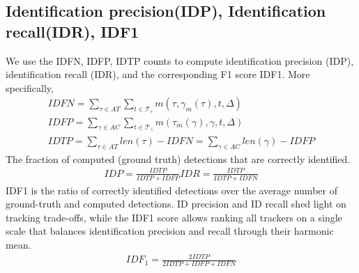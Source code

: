     \subsection{Identification precision(IDP), Identification recall(IDR), IDF1}
        We use the IDFN, IDFP, IDTP counts to compute identification precision (IDP), identification recall (IDR), and the corresponding F1 score IDF1. More specifically,
        \begin{align}
            IDFN = \sum_{\tau \in AT} \sum_{t \in \mathcal{T}_\tau} m(\tau, \gamma_m(\tau),t,\Delta) \\ 
            IDFP = \sum_{\gamma \in AC} \sum_{t \in \mathcal{T}_\gamma} m(\tau_m(\gamma),\gamma,t,\Delta) \\ 
            IDTP = \sum_{\tau \in  AT} len(\tau) - IDFN = \sum_{\gamma \in  AC} len(\gamma) - IDFP
        \end{align}        
        The fraction of computed (ground truth) detections that are correctly identified.
        \begin{align}
            IDP = \frac{IDTP}{IDTP + IDFP}
            IDR = \frac{IDTP}{IDTP + IDFN}
        \end{align}
        IDF1 is the ratio of correctly identified detections over the average number of ground-truth and computed detections. ID precision and ID recall shed light on tracking trade-offs, while the IDF1 score allows ranking all trackers on a single scale that balances identification precision and recall through their harmonic mean.
        \begin{align}
            IDF_1 = \frac{2IDTP}{2IDTP + IDFP + IDFN}
        \end{align}
